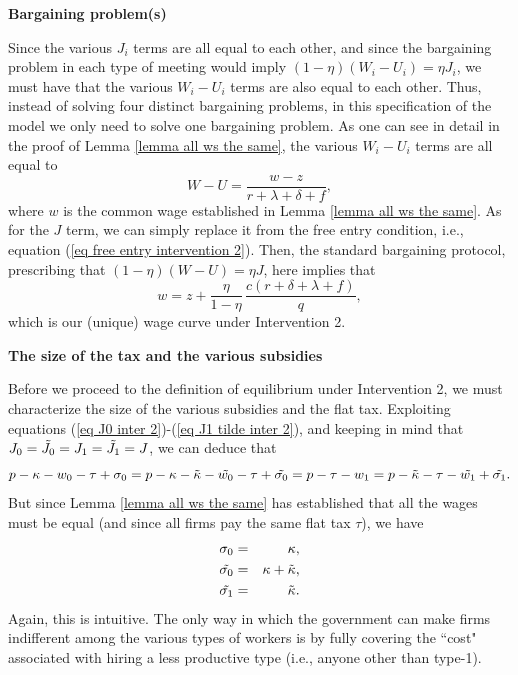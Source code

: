 \documentclass[12pt]{article} %
\theoremstyle{definition}
\begin{document}
\bigskip 

\noindent \textbf{Bargaining problem(s)}

Since the various $J_i$ terms are all equal to each other, and since the bargaining problem in each type of meeting would imply $(1-\eta)(W_i-U_i)=\eta J_i$, we must have that the various $W_i-U_i$ terms are also equal to each other. Thus, instead of solving four distinct bargaining problems, in this specification of the model we only need to solve one bargaining problem. As one can see in detail in the proof of Lemma \ref{lemma all ws the same}, the various $W_i-U_i$ terms are all equal to 
$$
W-U= \frac{w-z}{r+\lambda+\delta+f},   
$$where $w$ is the common wage established in Lemma \ref{lemma all ws the same}. As for the $J$ term, we can simply replace it from the free entry condition, i.e., equation (\ref{eq free entry intervention 2}). Then, the standard bargaining protocol, prescribing that $(1-\eta)(W-U)=\eta J$, here implies that
\begin{equation}
w = z + \frac{\eta}{1-\eta} \, \frac{c(r+\delta+\lambda+f)}{q}, \label{eq wage curve inter 2} 
\end{equation}which is our (unique) wage curve under Intervention 2. 


\bigskip 

\noindent \textbf{The size of the tax and the various subsidies}

\noindent Before we proceed to the definition of equilibrium under Intervention 2, we must characterize the size of the various subsidies and the flat tax. Exploiting equations (\ref{eq J0 inter 2})-(\ref{eq J1 tilde inter 2}), and keeping in mind that $J_0=\Tilde{J_0}=J_1=\Tilde{J_1}=J$, we can deduce that 
$$p-\kappa-w_0-\tau+\sigma_0 = p-\kappa-\Tilde{\kappa}-\Tilde{w_0}-\tau+\Tilde{\sigma_0}=p-\tau-w_1=p-\Tilde{\kappa}-\tau-\Tilde{w_1}+\Tilde{\sigma_1}.$$
But since Lemma \ref{lemma all ws the same} has established that all the wages must be equal (and since all firms pay the same flat tax $\tau$), we have 
\begin{eqnarray}
    \sigma_0&=&\kappa,\label{eq subsidy 0} \\
    \Tilde{\sigma_0}&=&\kappa + \Tilde{\kappa},\label{eq subsidy 0 tilde}\\
    \Tilde{\sigma_1}&=&\Tilde{\kappa}.\label{eq subsidy 1 tilde} 
\end{eqnarray}Again, this is intuitive. The only way in which the government can make firms indifferent among the various types of workers is by fully covering the ``cost" associated with hiring a less productive type (i.e., anyone other than type-1). 
\end{document}

